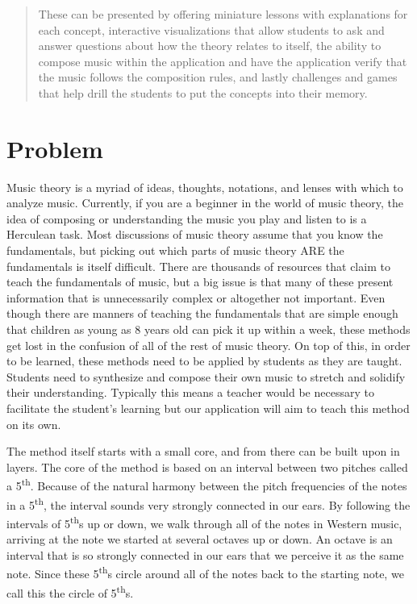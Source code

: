 \documentclass[onecolumn, draftclsnofoot,10pt, compsoc]{IEEEtran}
\begin{document}
\begin{titlepage}
\begin{singlespace}
\begin{abstract}
              These can be presented by offering miniature lessons with explanations for each concept, interactive visualizations that allow students to ask and answer questions about how the theory relates to itself, the ability to compose music within the application and have the application verify that the music follows the composition rules, and lastly challenges and games that help drill the students to put the concepts into their memory.
    
            \end{abstract}     
        \end{singlespace}
    \end{titlepage}
    \newpage
    \tableofcontents
    \clearpage
    
    \section{Problem}
    Music theory is a myriad of ideas, thoughts, notations, and lenses with which to analyze music. 
    Currently, if you are a beginner in the world of music theory, the idea of composing or understanding the music you play and listen to is a Herculean task. 
    Most discussions of music theory assume that you know the fundamentals, but picking out which parts of music theory ARE the fundamentals is itself difficult.
    There are thousands of resources that claim to teach the fundamentals of music, but a big issue is that many of these present information that is unnecessarily complex or altogether not important.
    Even though there are manners of teaching the fundamentals that are simple enough that children as young as 8 years old can pick it up within a week, these methods get lost in the confusion of all of the rest of music theory. 
    On top of this, in order to be learned, these methods need to be applied by students as they are taught. Students need to synthesize and compose their own music to stretch and solidify their understanding. 
    Typically this means a teacher would be necessary to facilitate the student's learning but our application will aim to teach this method on its own.
    
    \par
    The method itself starts with a small core, and from there can be built upon in layers. 
    The core of the method is based on an interval between two pitches called a 5\textsuperscript{th}. Because of the natural harmony between the pitch frequencies of the notes in a 5\textsuperscript{th}, the interval sounds very strongly connected in our ears. 
    By following the intervals of 5\textsuperscript{th}s up or down, we walk through all of the notes in Western music, arriving at the note we started at several octaves up or down. 
    An octave is an interval that is so strongly connected in our ears that we perceive it as the same note. 
    Since these 5\textsuperscript{th}s circle around all of the notes back to the starting note, we call this the circle of 5\textsuperscript{th}s. 
    
\end{document}
